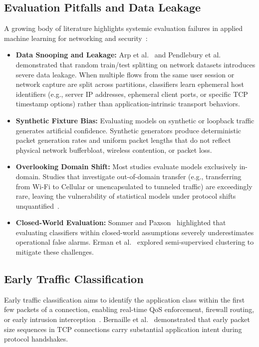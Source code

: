 \documentclass[conference]{IEEEtran}
\begin{document}
\subsection{Evaluation Pitfalls and Data Leakage}
A growing body of literature highlights systemic evaluation failures in applied machine learning for networking and security~\cite{arp2022dos,pendlebury2019tesseract,sommer2010outside,holland2021new}:
\begin{itemize}
    \item \textbf{Data Snooping and Leakage:} Arp et al.~\cite{arp2022dos} and Pendlebury et al.~\cite{pendlebury2019tesseract} demonstrated that random train/test splitting on network datasets introduces severe data leakage. When multiple flows from the same user session or network capture are split across partitions, classifiers learn ephemeral host identifiers (e.g., server IP addresses, ephemeral client ports, or specific TCP timestamp options) rather than application-intrinsic transport behaviors.
    \item \textbf{Synthetic Fixture Bias:} Evaluating models on synthetic or loopback traffic generates artificial confidence. Synthetic generators produce deterministic packet generation rates and uniform packet lengths that do not reflect physical network bufferbloat, wireless contention, or packet loss.
    \item \textbf{Overlooking Domain Shift:} Most studies evaluate models exclusively in-domain. Studies that investigate out-of-domain transfer (e.g., transferring from Wi-Fi to Cellular or unencapsulated to tunneled traffic) are exceedingly rare, leaving the vulnerability of statistical models under protocol shifts unquantified~\cite{dusi2009tunnel,drapergil2016characterization}.
    \item \textbf{Closed-World Evaluation:} Sommer and Paxson~\cite{sommer2010outside} highlighted that evaluating classifiers within closed-world assumptions severely underestimates operational false alarms. Erman et al.~\cite{erman2006traffic} explored semi-supervised clustering to mitigate these challenges.
\end{itemize}

\subsection{Early Traffic Classification}
Early traffic classification aims to identify the application class within the first few packets of a connection, enabling real-time QoS enforcement, firewall routing, or early intrusion interception~\cite{bernaille2006traffic,bernaille2007early}. Bernaille et al.~\cite{bernaille2006traffic,bernaille2007early} demonstrated that early packet size sequences in TCP connections carry substantial application intent during protocol handshakes. 
\end{document}
